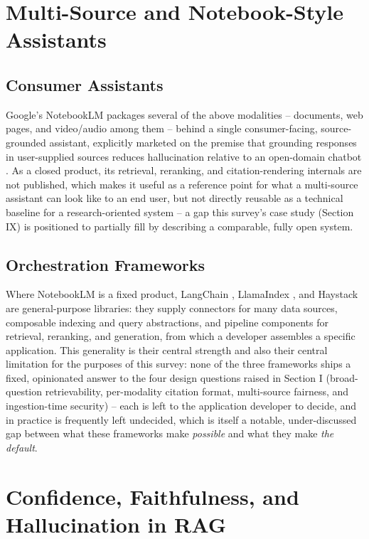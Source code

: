 \documentclass[conference]{IEEEtran}
\begin{document}
\section{Multi-Source and Notebook-Style Assistants}

\subsection{Consumer Assistants}
Google's NotebookLM packages several of the above modalities -- documents,
web pages, and video/audio among them -- behind a single consumer-facing,
source-grounded assistant, explicitly marketed on the premise that
grounding responses in user-supplied sources reduces hallucination
relative to an open-domain chatbot \cite{notebooklm2026}. As a closed
product, its retrieval, reranking, and citation-rendering internals are
not published, which makes it useful as a reference point for what a
multi-source assistant can look like to an end user, but not directly
reusable as a technical baseline for a research-oriented system -- a gap
this survey's case study (Section IX) is positioned to partially fill by
describing a comparable, fully open system.

\subsection{Orchestration Frameworks}
Where NotebookLM is a fixed product, LangChain \cite{langchain2026},
LlamaIndex \cite{llamaindex2026}, and Haystack \cite{haystack2026} are
general-purpose libraries: they supply connectors for many data sources,
composable indexing and query abstractions, and pipeline components for
retrieval, reranking, and generation, from which a developer assembles a
specific application. This generality is their central strength and also
their central limitation for the purposes of this survey: none of the
three frameworks ships a fixed, opinionated answer to the four design
questions raised in Section I (broad-question retrievability,
per-modality citation format, multi-source fairness, and ingestion-time
security) -- each is left to the application developer to decide, and in
practice is frequently left undecided, which is itself a notable,
under-discussed gap between what these frameworks make \emph{possible}
and what they make \emph{the default}.

\section{Confidence, Faithfulness, and Hallucination in RAG}
\end{document}
